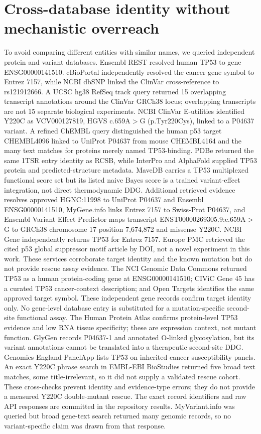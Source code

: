 \documentclass[11pt]{article}
\begin{document}
\section{Cross-database identity without mechanistic overreach}
To avoid comparing different entities with similar names, we queried independent protein and variant databases. Ensembl REST resolved human TP53 to gene ENSG00000141510. cBioPortal independently resolved the cancer gene symbol to Entrez 7157, while NCBI dbSNP linked the ClinVar cross-reference to rs121912666. A UCSC hg38 RefSeq track query returned 15 overlapping transcript annotations around the ClinVar GRCh38 locus; overlapping transcripts are not 15 separate biological experiments. NCBI ClinVar E-utilities identified Y220C as VCV000127819, HGVS c.659A$>$G (p.Tyr220Cys), linked to a P04637 variant. A refined ChEMBL query distinguished the human p53 target CHEMBL4096 linked to UniProt P04637 from mouse CHEMBL4164 and the many text matches for proteins merely named TP53-binding. PDBe returned the same 1TSR entry identity as RCSB, while InterPro and AlphaFold supplied TP53 protein and predicted-structure metadata. MaveDB carries a TP53 multiplexed functional score set but its listed naive Bayes score is a trained variant-effect integration, not direct thermodynamic DDG. Additional retrieved evidence resolves approved HGNC:11998 to UniProt P04637 and Ensembl ENSG00000141510, MyGene.info links Entrez 7157 to Swiss-Prot P04637, and Ensembl Variant Effect Predictor maps transcript ENST00000269305.9:c.659A$>$G to GRCh38 chromosome 17 position 7,674,872 and missense Y220C. NCBI Gene independently returns TP53 for Entrez 7157. Europe PMC retrieved the cited p53 global suppressor motif article by DOI, not a novel experiment in this work. These services corroborate target identity and the known mutation but do not provide rescue assay evidence. The NCI Genomic Data Commons returned TP53 as a human protein-coding gene at ENSG00000141510; CIViC Gene 45 has a curated TP53 cancer-context description; and Open Targets identifies the same approved target symbol. These independent gene records confirm target identity only. No gene-level database entry is substituted for a mutation-specific second-site functional assay. The Human Protein Atlas confirms protein-level TP53 evidence and low RNA tissue specificity; these are expression context, not mutant function. GlyGen records P04637-1 and annotated O-linked glycosylation, but its variant annotations cannot be translated into a therapeutic second-site DDG. Genomics England PanelApp lists TP53 on inherited cancer susceptibility panels. An exact Y220C phrase search in EMBL-EBI BioStudies returned five broad text matches, some title-irrelevant, so it did not supply a validated rescue cohort.  These cross-checks prevent identity and evidence-type errors; they do not provide a measured Y220C double-mutant rescue. The exact record identifiers and raw API responses are committed in the repository results. MyVariant.info was queried but broad gene-text search returned many genomic records, so no variant-specific claim was drawn from that response.
\end{document}
